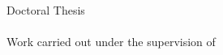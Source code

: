 \begin{titlepage}
\pagecolor{PANTONECoolGray7C}
\afterpage{\nopagecolor}
\color{white}
\thelogo
\leading{20.4pt}
{\Large
\thethesisauthor
\\

\textbf{\thetitleA}
\\
\textbf{\thetitleB}
\\
\textbf{\thetitleC}
}

\vspace*{\fill}
{\footnotesize \myear}
\end{titlepage}

\null
\thispagestyle{empty}
\pagecolor{PANTONE1807C}
\afterpage{\nopagecolor}
\newpage

\begin{titlepage}
\color{PANTONECoolGray7C}
\thelogoB
\leading{20.4pt}
{\Large
\thethesisauthor
\\
%
\\
\textbf{\thetitleA}
\\
\textbf{\thetitleB}
\\
\textbf{\thetitleC}
}

\vspace{55.2mm}
\leading{16.8pt}
{\large
Doctoral Thesis
\\
\thephd
\\
\thearea
Work carried out under the supervision of
\\
\textbf{\thesupervisor}
\\
\thecosupervisor}

\vspace*{\fill}
{\footnotesize \myear}
\end{titlepage}

\null
\thispagestyle{empty}
\pagecolor{white}
\afterpage{\nopagecolor}
\newpage